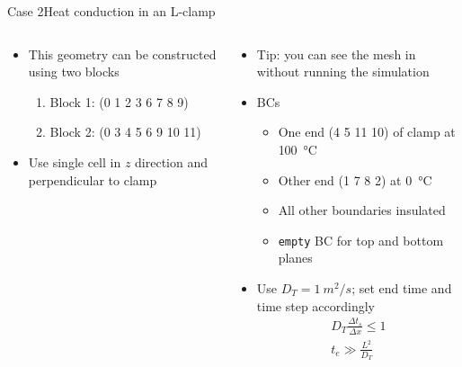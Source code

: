 \begin{frame}{Case 2}{Heat conduction in an L-clamp}
\begin{columns}
\begin{column}{0.5\linewidth}
\begin{figure}
            \end{figure}
            \begin{itemize}
                \item This geometry can be constructed using two blocks
                \begin{enumerate}
                    \item Block 1: (0 1 2 3 6 7 8 9)
                    \item Block 2: (0 3 4 5 6 9 10 11)
                \end{enumerate}
                \item Use single cell in $z$ direction and perpendicular to clamp
            \end{itemize}
        \end{column}
        \begin{column}{0.5\linewidth}
            \begin{itemize}
                \item Tip: you can see the mesh in \paraview{} without running the simulation
                \item BCs
                \begin{itemize}
                    \item One end (4 5 11 10) of clamp at \qty{100}{\degreeCelsius}
                    \item Other end (1 7 8 2) at \qty{0}{\degreeCelsius}
                    \item All other boundaries insulated
                    \item \texttt{empty} BC for top and bottom planes
                \end{itemize}
                \item Use $D_T=\qty{1}{m^2/s}$; set end time and time step accordingly
                \begin{gather*}
                    D_T \frac{\Delta t_s}{\Delta x} \le 1\\
                    t_e \gg \frac{L^2}{D_T}
                \end{gather*}
            \end{itemize}
        \end{column}
    \end{columns}
\end{frame}

